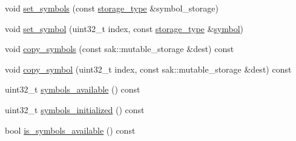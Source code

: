\begin{DoxyCompactItemize}
void \hyperlink{classkodo_1_1shallow__symbol__storage_a585ea94cdb23a2fd5e8237fc34222512}{set\-\_\-symbols} (const \hyperlink{classkodo_1_1shallow__symbol__storage_a258cef59dc5a316875bcdce09ab0c338}{storage\-\_\-type} \&symbol\-\_\-storage)
\begin{DoxyCompactList}\small\item\em \end{DoxyCompactList}\item 
void \hyperlink{classkodo_1_1shallow__symbol__storage_a7034a94fd120ba628febad1bae90bfbd}{set\-\_\-symbol} (uint32\-\_\-t index, const \hyperlink{classkodo_1_1shallow__symbol__storage_a258cef59dc5a316875bcdce09ab0c338}{storage\-\_\-type} \&\hyperlink{classkodo_1_1shallow__symbol__storage_a83b85d9c28f40abc61d29e38ce13cdfd}{symbol})
\begin{DoxyCompactList}\small\item\em \end{DoxyCompactList}\item 
void \hyperlink{classkodo_1_1shallow__symbol__storage_a28170c82efb2439196db73a61d0f1247}{copy\-\_\-symbols} (const sak\-::mutable\-\_\-storage \&dest) const 
\begin{DoxyCompactList}\small\item\em \end{DoxyCompactList}\item 
void \hyperlink{classkodo_1_1shallow__symbol__storage_a44c3d9966cf9d770ebb195b7480b54e9}{copy\-\_\-symbol} (uint32\-\_\-t index, const sak\-::mutable\-\_\-storage \&dest) const 
\begin{DoxyCompactList}\small\item\em \end{DoxyCompactList}\item 
uint32\-\_\-t \hyperlink{classkodo_1_1shallow__symbol__storage_ad846357e5aa94582519963527d913b3f}{symbols\-\_\-available} () const 
\begin{DoxyCompactList}\small\item\em \end{DoxyCompactList}\item 
uint32\-\_\-t \hyperlink{classkodo_1_1shallow__symbol__storage_a7df0cb04a32716c8165bacd4209b9128}{symbols\-\_\-initialized} () const 
\begin{DoxyCompactList}\small\item\em \end{DoxyCompactList}\item 
bool \hyperlink{classkodo_1_1shallow__symbol__storage_aaa0397d76d44280f529556d8a3d1628f}{is\-\_\-symbols\-\_\-available} () const 

\end{DoxyCompactItemize}
